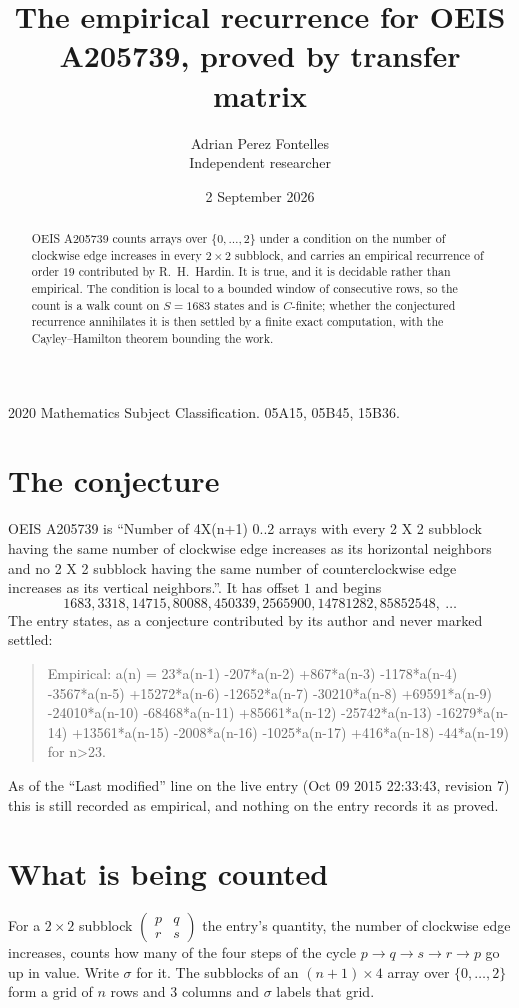 \documentclass[11pt,a4paper]{article}
\title{The empirical recurrence for OEIS A205739, proved by transfer matrix}
\author{Adrian Perez Fontelles\\ \small Independent researcher}
\date{2 September 2026}
\theoremstyle{plain}
\theoremstyle{definition}
\begin{document}
\maketitle

\begin{abstract}
OEIS A205739 counts arrays over $\{0,\dots,2\}$ under a condition on the number of clockwise edge increases
in every $2\times2$ subblock, and carries an empirical recurrence of order $19$ contributed by
R.~H.~Hardin. It is true, and it is decidable rather than empirical. The condition is local to
a bounded window of consecutive rows, so the count is a walk count on $S=1683$ states and is
$C$-finite; whether the conjectured recurrence annihilates it is then settled by a finite exact
computation, with the Cayley--Hamilton theorem bounding the work.
\end{abstract}

\noindent\small 2020 Mathematics Subject Classification. 05A15, 05B45, 15B36.\normalsize

\section{The conjecture}

OEIS A205739 is ``Number of 4X(n+1) 0..2 arrays with every 2 X 2 subblock having the same number of clockwise edge increases as its horizontal neighbors and no 2 X 2 subblock having the same number of counterclockwise edge increases as its vertical neighbors.''. It has offset $1$ and begins
\[
1683, 3318, 14715, 80088, 450339, 2565900, 14781282, 85852548,\ \dots
\]
The entry states, as a conjecture contributed by its author and never marked settled:
\begin{quote}
Empirical: a(n) = 23*a(n-1) -207*a(n-2) +867*a(n-3) -1178*a(n-4) -3567*a(n-5) +15272*a(n-6) -12652*a(n-7) -30210*a(n-8) +69591*a(n-9) -24010*a(n-10) -68468*a(n-11) +85661*a(n-12) -25742*a(n-13) -16279*a(n-14) +13561*a(n-15) -2008*a(n-16) -1025*a(n-17) +416*a(n-18) -44*a(n-19) for n>23.
\end{quote}
As of the ``Last modified'' line on the live entry (Oct 09 2015 22:33:43, revision 7) this is still
recorded as empirical, and nothing on the entry records it as proved.

\section{What is being counted}

For a $2\times2$ subblock $\begin{pmatrix}p&q\\r&s\end{pmatrix}$ the
entry's quantity, the number of clockwise edge increases, counts how many of the four steps of the cycle $p\to q\to s\to r\to p$ go up in value. Write $\sigma$ for it. The subblocks of an
$(n+1)\times4$ array over $\{0,\dots,2\}$ form a grid of $n$ rows and $3$
columns and $\sigma$ labels that grid.
\end{document}
